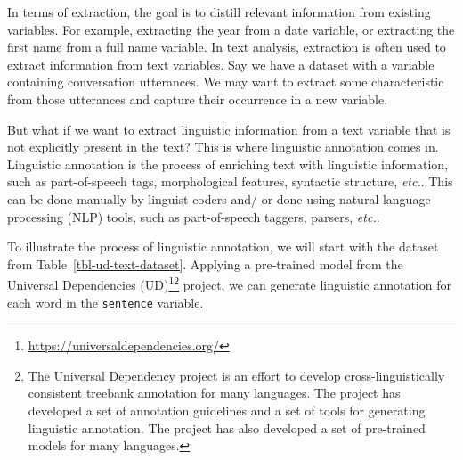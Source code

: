 \documentclass[
  letterpaper,
  DIV=11,
  numbers=noendperiod]{scrreprt}
\theoremstyle{definition}
\theoremstyle{remark}
\DeclareRobustCommand{\href}[2]{#2\footnote{\url{#1}}}
\begin{document}
In terms of extraction, the goal is to distill relevant information from
existing variables. For example, extracting the year from a date
variable, or extracting the first name from a full name variable. In
text analysis, extraction is often used to extract information from text
variables. Say we have a dataset with a variable containing conversation
utterances. We may want to extract some characteristic from those
utterances and capture their occurrence in a new variable.

But what if we want to extract linguistic information from a text
variable that is not explicitly present in the text? This is where
linguistic annotation comes in. Linguistic annotation is the process of
enriching text with linguistic information, such as part-of-speech tags,
morphological features, syntactic structure, \emph{etc.}. This can be
done manually by linguist coders and/ or done using natural language
processing (NLP) tools, such as part-of-speech taggers, parsers,
\emph{etc.}.

To illustrate the process of linguistic annotation, we will start with
the dataset from Table~\ref{tbl-ud-text-dataset}. Applying a pre-trained
model from the \href{https://universaldependencies.org/}{Universal
Dependencies (UD)}\footnote{The Universal Dependency project is an
  effort to develop cross-linguistically consistent treebank annotation
  for many languages. The project has developed a set of annotation
  guidelines and a set of tools for generating linguistic annotation.
  The project has also developed a set of pre-trained models for many
  languages.} project, we can generate linguistic annotation for each
word in the \texttt{sentence} variable.
\end{document}
